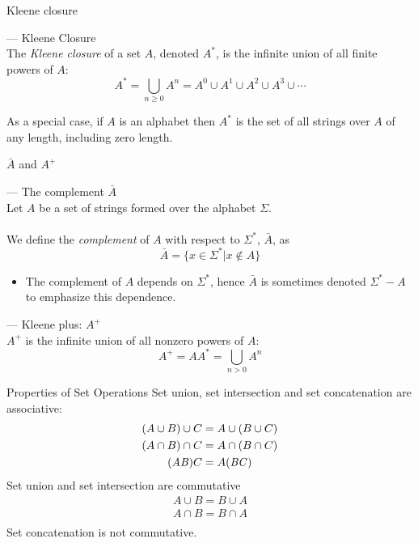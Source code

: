 \begin{slide}[bm=,toc=]{Kleene closure}
\begin{defn}{--- Kleene Closure}~\\
\pause
The \emph{Kleene closure} of a set $A$, denoted $A^*$, is the infinite union of all
finite powers of $A$:
\pause
\[
A^* = \bigcup_{n \geq 0} A^n = A^0 \cup A^1 \cup A^2 \cup A^3 \cup \cdots
\]
\end{defn}
\pause
As a special case, if $A$ is an alphabet then $A^*$ is the set of all strings
over $A$ of any length, including zero length.
\end{slide}

\begin{slide}[bm=,toc=]{$\bar{A}$ and $A^+$}
\begin{defn}{--- The complement $\bar{A}$}~\\
\pause
Let $A$ be a set of strings formed over the alphabet $\Sigma$. \\~\\
\pause
We define the \emph{complement} of $A$ with respect to $\Sigma^*$, $\bar{A}$, as 
\pause
\[
\bar{A} = \{x \in \Sigma^* | x \notin A\}
\]
\end{defn}
\pause
\begin{itemize}
\item The complement of $A$ depends on $\Sigma^*$, hence $\bar{A}$ is sometimes denoted $\Sigma^* - A$ to emphasize this dependence.
\end{itemize}
\pause
\begin{defn}{--- Kleene plus: $A^+$}~\\
\pause
$A^+$ is the infinite union of all nonzero powers of $A$:
\pause
\[
A^+ = AA^* = \bigcup_{n>0} A^n
\]
\end{defn}

\end{slide}

\begin{slide}[bm=,toc=]{Properties of Set Operations}
Set union, set intersection and set concatenation are associative: 
\pause
\begin{align*}
     (A\cup B) \cup C &= A \cup (B \cup C) \\
     (A\cap B) \cap C &= A \cap (B \cap C) \\
          (\mathit{AB})C &= A(\mathit{BC})
\end{align*}
\pause
Set union and set intersection are commutative
\pause
   \[
     \begin{split}
     A\cup B = B \cup A \\
     A\cap B = B \cap A \\
     \end{split}
    \]
\pause
Set concatenation is not commutative.
\end{slide}

